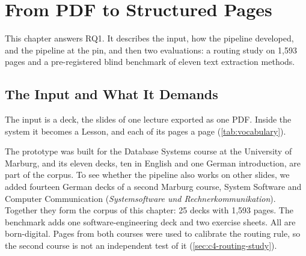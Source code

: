 \chapter{From PDF to Structured Pages}
\label{ch:content}

This chapter answers RQ1. It describes the input, how the pipeline developed,
and the pipeline at the pin, and then two evaluations: a routing study on
1{,}593 pages and a pre-registered blind benchmark of eleven text extraction
methods.

\section{The Input and What It Demands}
\label{sec:c4-requirements}

The input is a deck, the slides of one lecture exported as one PDF. Inside the
system it becomes a Lesson, and each of its pages a page
(\cref{tab:vocabulary}).

The prototype was built for the Database Systems course at the University of
Marburg, and its eleven decks, ten in English and one German introduction,
are part of the corpus. To see whether the pipeline also works on other
slides, we added fourteen German decks of a second Marburg course, System
Software and Computer Communication (\emph{Systemsoftware und
Rechnerkommunikation}). Together they form the corpus of this
chapter: 25 decks with 1{,}593 pages. The benchmark adds one
software-engineering deck and two exercise sheets. All are
born-digital. Pages from both
courses were used to calibrate the routing rule, so the second course is not
an independent test of it (\cref{sec:c4-routing-study}).

